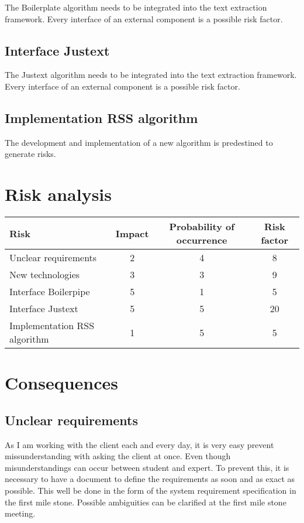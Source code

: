 The Boilerplate algorithm needs to be integrated into the text extraction framework. Every interface of an external component is a possible risk factor.

\subsection{Interface Justext}


The Justext algorithm needs to be integrated into the text extraction framework. Every interface of an external component is a possible risk factor.


\subsection{Implementation RSS algorithm}

The development and implementation of a new algorithm is predestined to generate risks.

\section{Risk analysis}

\begin{table}[h]
\begin{tabular}{|l|c|c|c|}
\hline
\textbf{Risk} & \textbf{Impact} & \textbf{Probability of occurrence} & \textbf{Risk factor} \\ \hline
Unclear requirements & 2 & 4 & 8\\ \hline
New technologies & 3 & 3 & 9 \\ \hline
Interface Boilerpipe & 5 & 1 & 5\\ \hline
Interface Justext & 5 & 5 & 20 \\ \hline
Implementation RSS algorithm & 1 & 5 & 5\\ \hline
\end{tabular}
\end{table}

\section{Consequences}



\subsection{Unclear requirements}

As I am working with the client each and every day, it is very easy prevent missunderstanding with asking the client at once. Even though misunderstandings can occur between student and expert. To prevent this, it is necessary to have a document to define the requirements as soon and as exact as possible. This well be done in the form of the system requirement specification in the first mile stone. Possible ambiguities can be clarified at the first mile stone meeting.

